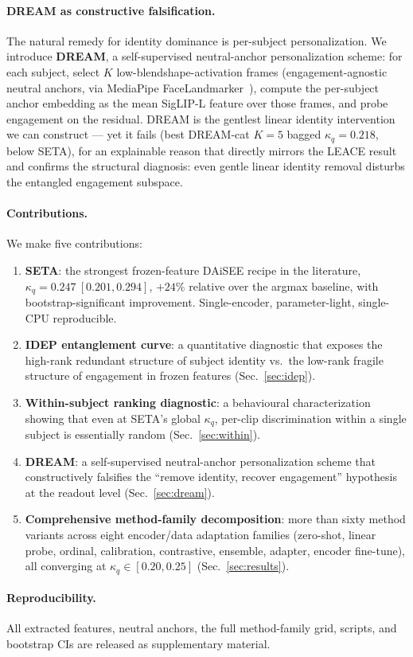 \paragraph{DREAM as constructive falsification.} The natural
remedy for identity dominance is per-subject personalization. We
introduce \textbf{DREAM}, a self-supervised neutral-anchor
personalization scheme: for each subject, select $K$
low-blendshape-activation frames (engagement-agnostic neutral
anchors, via MediaPipe FaceLandmarker~\cite{lugaresi2019mediapipe}),
compute the per-subject anchor embedding as the mean SigLIP-L
feature over those frames, and probe engagement on the residual.
DREAM is the gentlest linear identity intervention we can construct
--- yet it fails (best DREAM-cat $K{=}5$ bagged $\kappa_q = 0.218$,
below SETA), for an explainable reason that directly mirrors the
LEACE result and confirms the structural diagnosis: even gentle
linear identity removal disturbs the entangled engagement subspace.

\paragraph{Contributions.} We make five contributions:
\begin{enumerate}\itemsep0pt
  \item \textbf{SETA}: the strongest frozen-feature DAiSEE recipe in
   the literature, $\kappa_q = 0.247~[0.201, 0.294]$, $+24\%$
   relative over the argmax baseline, with bootstrap-significant
   improvement. Single-encoder, parameter-light, single-CPU
   reproducible.
  \item \textbf{IDEP entanglement curve}: a quantitative diagnostic
   that exposes the high-rank redundant structure of subject
   identity vs.\ the low-rank fragile structure of engagement in
   frozen features (Sec.~\ref{sec:idep}).
  \item \textbf{Within-subject ranking diagnostic}: a behavioural
   characterization showing that even at SETA's global $\kappa_q$,
   per-clip discrimination within a single subject is essentially
   random (Sec.~\ref{sec:within}).
  \item \textbf{DREAM}: a self-supervised neutral-anchor
   personalization scheme that constructively falsifies the
   ``remove identity, recover engagement'' hypothesis at the
   readout level (Sec.~\ref{sec:dream}).
  \item \textbf{Comprehensive method-family decomposition}: more
   than sixty method variants across eight encoder/data adaptation
   families (zero-shot, linear probe, ordinal, calibration,
   contrastive, ensemble, adapter, encoder fine-tune), all
   converging at $\kappa_q \in [0.20, 0.25]$ (Sec.~\ref{sec:results}).
\end{enumerate}

\paragraph{Reproducibility.} All extracted features, neutral
anchors, the full method-family grid, scripts, and bootstrap CIs
are released as supplementary material.
